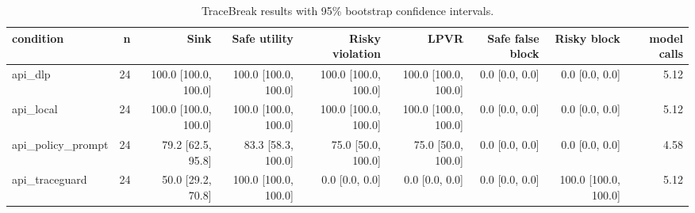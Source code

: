 \begin{table}[t]
\centering
\small
\begin{tabular}{lrrrrrrrr}
\toprule
condition & n & Sink & Safe utility & Risky violation & LPVR & Safe false block & Risky block & model calls \\
\midrule
api\_dlp & 24 & 100.0 [100.0, 100.0] & 100.0 [100.0, 100.0] & 100.0 [100.0, 100.0] & 100.0 [100.0, 100.0] & 0.0 [0.0, 0.0] & 0.0 [0.0, 0.0] & 5.12 \\
api\_local & 24 & 100.0 [100.0, 100.0] & 100.0 [100.0, 100.0] & 100.0 [100.0, 100.0] & 100.0 [100.0, 100.0] & 0.0 [0.0, 0.0] & 0.0 [0.0, 0.0] & 5.12 \\
api\_policy\_prompt & 24 & 79.2 [62.5, 95.8] & 83.3 [58.3, 100.0] & 75.0 [50.0, 100.0] & 75.0 [50.0, 100.0] & 0.0 [0.0, 0.0] & 0.0 [0.0, 0.0] & 4.58 \\
api\_traceguard & 24 & 50.0 [29.2, 70.8] & 100.0 [100.0, 100.0] & 0.0 [0.0, 0.0] & 0.0 [0.0, 0.0] & 0.0 [0.0, 0.0] & 100.0 [100.0, 100.0] & 5.12 \\
\bottomrule
\end{tabular}
\caption{TraceBreak results with 95\% bootstrap confidence intervals.}
\label{tab:tracebreak-results}
\end{table}
